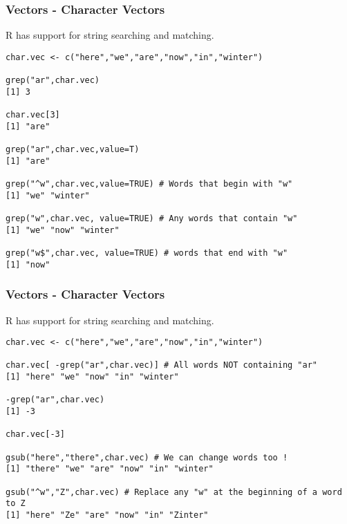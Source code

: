 \documentclass{beamer}
\begin{document}
%
\begin{frame}[fragile]
\frametitle{Vectors - Character Vectors}
R has support for string searching and matching.
\footnotesize
\begin{verbatim}
char.vec <- c("here","we","are","now","in","winter")

grep("ar",char.vec)
[1] 3

char.vec[3]
[1] "are"

grep("ar",char.vec,value=T)
[1] "are"

grep("^w",char.vec,value=TRUE) # Words that begin with "w"
[1] "we" "winter"

grep("w",char.vec, value=TRUE) # Any words that contain "w"
[1] "we" "now" "winter"

grep("w$",char.vec, value=TRUE) # words that end with "w"
[1] "now"
\end{verbatim}
\end{frame}

%
\begin{frame}[fragile]
\frametitle{Vectors - Character Vectors}
R has support for string searching and matching.
\footnotesize
\begin{verbatim}
char.vec <- c("here","we","are","now","in","winter")

char.vec[ -grep("ar",char.vec)] # All words NOT containing "ar"
[1] "here" "we" "now" "in" "winter"

-grep("ar",char.vec)
[1] -3

char.vec[-3]

gsub("here","there",char.vec) # We can change words too !
[1] "there" "we" "are" "now" "in" "winter"

gsub("^w","Z",char.vec) # Replace any "w" at the beginning of a word to Z
[1] "here" "Ze" "are" "now" "in" "Zinter"

\end{verbatim}
\end{frame}
\end{document}
